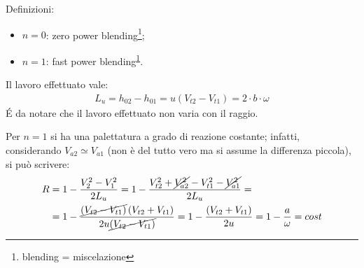Definizioni:
\begin{itemize}
\item $n=0$: zero power blending\footnote{\label{nota} blending = miscelazione};
\item $n=1$: fast power blending\textsuperscript{\ref{nota}}.
\end{itemize}

Il lavoro effettuato vale:
\begin{align*}
L_u = h_{02} - h_{01} = u \left( V_{t2} - V_{t1} \right) = 2 \cdot b \cdot \omega
\end{align*}
\'E da notare che il lavoro effettuato non varia con il raggio.

Per $n=1$ si ha una palettatura a grado di reazione costante; infatti, considerando $V_{a2} \simeq V_{a1}$ (non è del tutto vero ma si assume la differenza piccola), si può scrivere:
\begin{align*}
\begin{split}
	R &= 1 - \frac{V_2^2 - V_1^2}{2 L_u} = 1 - \frac{V_{t2}^2 + \cancel{V_{a2}^2} - V_{t1}^2 - \cancel{V_{a1}^2}}{2 L_u}=\\
	 &= 1 - \frac{\cancel{\left( V_{t2} - V_{t1} \right)} \left( V_{t2}+ V_{t1} \right)}{2 u \cancel{\left( V_{t2}- V_{t1} \right)}} = 1- \frac{\left( V_{t2}+ V_{t1} \right)}{2 u} = 1-\frac{a}{\omega} = cost
\end{split}
\end{align*}
